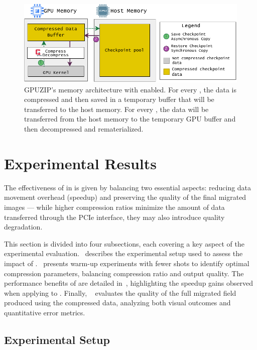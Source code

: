\documentclass[Ingles]{ic-tese-v3}
\begin{document}
\begin{figure}[h]
  \centering
  \includegraphics[width=0.9\linewidth,trim={0 0 0 0},clip]{figures/comp_arch.pdf}
  \caption[Memory architecture diagram (\compression)]{GPUZIP's memory architecture with \compression enabled. For every \save, the data is compressed and then saved in a temporary buffer that will be transferred to the host memory. For every \restore, the data will be transferred from the host memory to the temporary GPU buffer and then decompressed and rematerialized.}
  \label{fig:archnew_wcomp}
\end{figure}


\section{Experimental Results}
\label{sec:comp_results}

The effectiveness of \compression in \awave is given by balancing two essential aspects: reducing data movement overhead (speedup) and preserving the quality of the final migrated images --- while higher compression ratios minimize the amount of data transferred through the PCIe interface, they may also introduce quality degradation.

This section is divided into four subsections, each covering a key aspect of the experimental evaluation.~ describes the experimental setup used to assess the impact of \compression.~ presents warm-up experiments with fewer shots to identify optimal compression parameters, balancing compression ratio and output quality. The performance benefits of \compression are detailed in~, highlighting the speedup gains observed when applying \compression to \awave. Finally, ~ evaluates the quality of the full migrated field produced using the compressed data, analyzing both visual outcomes and quantitative error metrics.

\subsection{Experimental Setup}
\label{sec:compress_exp_setup}
\end{document}
